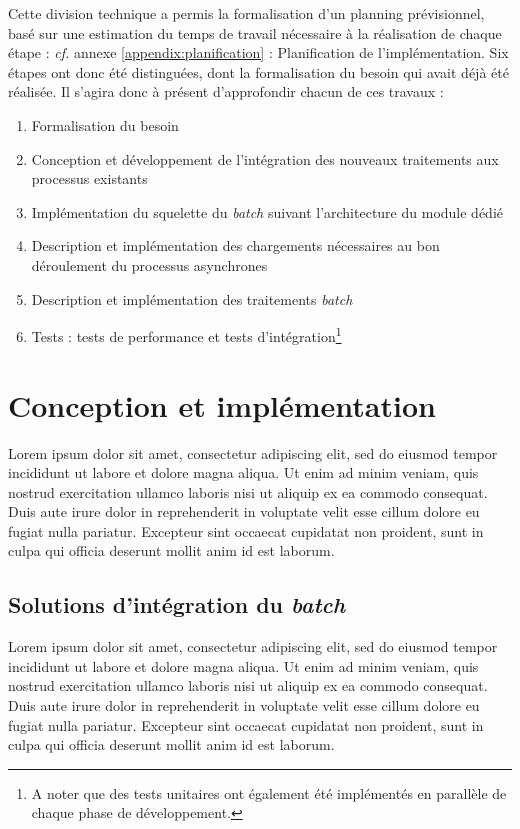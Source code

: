 \documentclass[a4paper, 12pt]{report}
\begin{document}
Cette division technique a permis la formalisation d'un planning prévisionnel, basé sur une estimation du temps de travail nécessaire à la réalisation de chaque étape : \textit{cf.} annexe \ref{appendix:planification} : Planification de l'implémentation. Six étapes ont donc été distinguées, dont la formalisation du besoin qui avait déjà été réalisée. Il s'agira donc à présent d'approfondir chacun de ces travaux :\\

\begin{enumerate}
  \item Formalisation du besoin
  \item Conception et développement de l'intégration des nouveaux traitements aux processus existants
  \item Implémentation du squelette du \textit{batch} suivant l'architecture du module dédié
  \item Description et implémentation des chargements nécessaires au bon déroulement du processus asynchrones
  \item Description et implémentation des traitements \textit{batch}
  \item Tests : tests de performance et tests d'intégration\footnote{A noter que des tests unitaires ont également été implémentés en parallèle de chaque phase de développement.}
\end{enumerate}

\section{Conception et implémentation}

Lorem ipsum dolor sit amet, consectetur adipiscing elit, sed do eiusmod tempor incididunt ut labore et dolore magna aliqua. Ut enim ad minim veniam, quis nostrud exercitation ullamco laboris nisi ut aliquip ex ea commodo consequat. Duis aute irure dolor in reprehenderit in voluptate velit esse cillum dolore eu fugiat nulla pariatur. Excepteur sint occaecat cupidatat non proident, sunt in culpa qui officia deserunt mollit anim id est laborum.

\subsection{Solutions d'intégration du \textit{batch}}

Lorem ipsum dolor sit amet, consectetur adipiscing elit, sed do eiusmod tempor incididunt ut labore et dolore magna aliqua. Ut enim ad minim veniam, quis nostrud exercitation ullamco laboris nisi ut aliquip ex ea commodo consequat. Duis aute irure dolor in reprehenderit in voluptate velit esse cillum dolore eu fugiat nulla pariatur. Excepteur sint occaecat cupidatat non proident, sunt in culpa qui officia deserunt mollit anim id est laborum.
\end{document}
